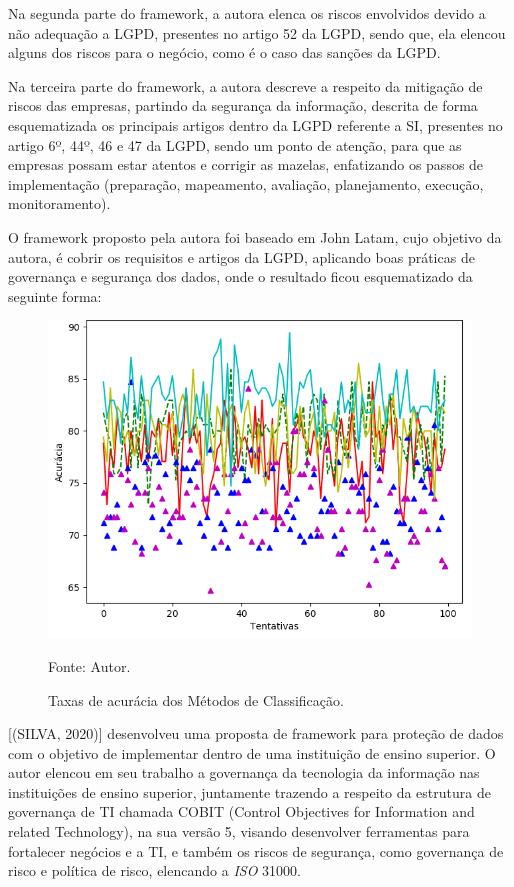 \documentclass[
	12pt,				%
	openright,			%
	oneside,			%
	a4paper,			%
	english,			%
	french,				%
	spanish,			%
	brazil,				%
	]{abntex2}
\begin{document}
Na segunda parte do framework, a autora elenca os riscos envolvidos devido a não adequação a LGPD, presentes no artigo 52 da LGPD, sendo que, ela elencou alguns dos riscos para o negócio, como é o caso das sanções da LGPD.

Na terceira parte do framework, a autora descreve a respeito da mitigação de riscos das empresas, partindo da segurança da informação, descrita de forma esquematizada os principais artigos dentro da LGPD referente a SI, presentes no artigo 6º, 44º, 46 e 47 da LGPD, sendo um ponto de atenção, para que as empresas possam estar atentos e corrigir as mazelas, enfatizando os passos de implementação (preparação, mapeamento, avaliação, planejamento, execução, monitoramento).

O framework proposto pela autora foi baseado em John Latam, cujo objetivo da autora, é cobrir os requisitos e artigos da LGPD, aplicando boas práticas de governança e segurança dos dados, onde o resultado ficou esquematizado da seguinte forma:

\begin{figure}[ht]
    \centering
    \caption{Taxas de acurácia dos Métodos de Classificação.}
    \includegraphics[width=5.0in]{Images/acc-classification.png}
    \label{fig: grafico-acc}
    
    \centering \small Fonte: Autor.
\end{figure}

[(SILVA, 2020)] desenvolveu uma proposta de framework para proteção de dados com o objetivo de implementar dentro de uma instituição de ensino superior. O autor elencou em seu trabalho a governança da tecnologia da informação nas instituições de ensino superior, juntamente trazendo a respeito da estrutura de governança de TI chamada COBIT (Control Objectives for Information and related Technology), na sua versão 5, visando desenvolver ferramentas para fortalecer negócios e a TI, e também os riscos de segurança, como governança de risco e política de risco, elencando a \textit{ISO} 31000.
\end{document}
